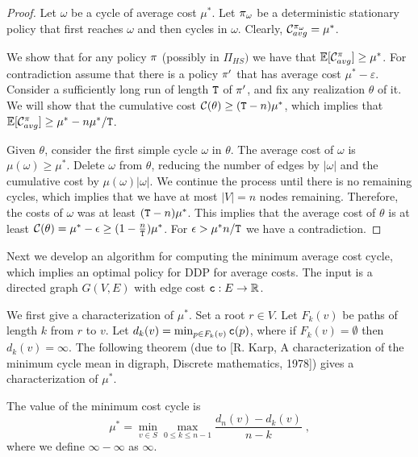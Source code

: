 \begin{proof}
Let $\omega$ be a cycle of average cost $\mu^*$. Let
$\pi_{\omega}$ be a deterministic stationary policy that first
reaches $\omega$ and then cycles in $\omega$. Clearly,
$\mathcal{C}^{\pi_\omega}_{avg}=\mu^*$.

We show that for any policy $\pi$ (possibly in $\Pi_{HS})$ we
have that $\mathbb{E}[\mathcal{C}^\pi_{avg}]\geq \mu^*$. For contradiction
assume that there is a policy $\pi'$ that has average cost
$\mu^*-\varepsilon$. Consider a sufficiently long run of length
${\tt T}$ of $\pi'$, and fix any realization $\theta$ of it.
We will show that the cumulative cost $\mathcal{C}(\theta)\geq
({\tt T}-n)\mu^*$, which implies that $\mathbb{E}[\mathcal{C}^\pi_{avg}]\geq
\mu^* -n\mu^*/{\tt T}$.

Given $\theta$, consider the first simple cycle $\omega$ in
$\theta$. The average cost of $\omega$ is $\mu(\omega)\geq\mu^*$.
Delete $\omega$ from $\theta$, reducing the number of edges by
$|\omega|$ and the cumulative cost by $\mu(\omega)|\omega|$. We
continue the process until there is no remaining cycles, which
implies that we have at most $|V|=n$ nodes remaining. Therefore, the
costs of $\omega$ was at least $({\tt T}-n)\mu^*$. This implies
that the average cost of $\theta$ is at least $\mathcal{C}(\theta)=\mu^*-\epsilon\geq
(1-\frac{n}{{\tt T}})\mu^*$. For $\epsilon>\mu^* n/{\tt T}$ we
have a contradiction.
\end{proof}

Next we develop an algorithm for computing the minimum average cost
cycle, which implies an optimal policy for DDP for average costs.
The input is a directed graph $G(V,E)$ with edge cost ${\tt c}:E\rightarrow {\mathbb R}$.

We first give a characterization of $\mu^*$. Set a root $r\in V$.
Let $F_{k}(v)$ be paths of length $k$ from $r$ to $v$. Let
$d_{k}(v)=\min_{p\in F_{k}(v)} {\tt c}(p)$, where if
$F_{k}(v)=\emptyset$ then $d_{k}(v)=\infty$. The following theorem
(due to [R. Karp, A characterization of the minimum cycle mean in
digraph, Discrete mathematics, 1978]) gives a characterization of
$\mu^*$.

\begin{theorem}
The value of the minimum cost cycle is
\[
\mu^*=\min_{v\in S} \max_{0\leq k \leq n-1}
\frac{d_n(v)-d_{k}(v)}{n-k}\;,
\]
where we define $\infty-\infty$ as $\infty$.
\end{theorem}

